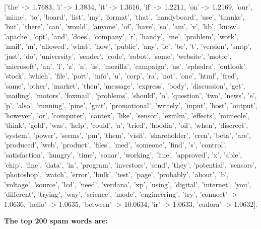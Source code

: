 \documentclass{article}
\begin{document}
['the' -> 1.7683, 'i' -> 1.3834, 'it' -> 1.3616, 'if' -> 1.2211, 'on' -> 1.2169, 'our', 'mime', 'to', 'board', 'list', 'my', 'format', 'that', 'handyboard', 'use', 'thanks', 'but', 'there', 'can', 'would', 'anyone', 'of', 'have', 'so', 'am', 'v', 'hb', 'know', 'apache', 'opt', 'and', 'does', 'company', 'r', 'handy', 'me', 'problem', 'work', 'mail', 'm', 'allowed', 'what', 'how', 'public', 'any', 'ic', 'be', 't', 'version', 'smtp', 'just', 'do', 'university', 'sender', 'code', 'robot', 'some', 'website', 'motor', 'microsoft', 'an', 'l', 'z', 'n', 'is', 'mozilla', 'campaign', 'as', 'ephedra', 'outlook', 'stock', 'which', 'file', 'port', 'info', 'u', 'corp', 'ra', 'not', 'one', 'html', 'fred', 'same', 'other', 'market', 'then', 'message', 'express', 'body', 'discussion', 'get', 'mailing', 'motors', 'foxmail', 'problems', 'should', 'o', 'question', 'two', 'news', 'e', 'p', 'also', 'running', 'pine', 'gmt', 'promotional', 'writely', 'input', 'host', 'output', 'however', 'or', 'computer', 'cantex', 'like', 'sensor', 'ezmlm', 'effects', 'mimeole', 'think', 'gold', 'was', 'help', 'could', 'a', 'tried', 'hoodia', 'oil', 'when', 'discreet', 'system', 'power', 'seems', 'pm', 'them', 'visit', 'shareholder', 'cren', 'beta', 'are', 'produced', 'web', 'product', 'files', 'med', 'someone', 'find', 's', 'control', 'satisfaction', 'hungry', 'time', 'sonar', 'working', 'line', 'approved', 'x', 'able', 'chip', 'fine', 'data', 'in', 'program', 'investors', 'send', 'they', 'potential', 'sensors', 'photoshop', 'watch', 'error', 'bulk', 'test', 'page', 'probably', 'about', 'b', 'voltage', 'source', 'lcd', 'need', 'verdana', 'xp', 'using', 'digital', 'internet', 'you', 'different', 'trying', 'way', 'science', 'mode', 'engineering', 'try', 'connect' -> 1.0636, 'hello' -> 1.0635, 'between' -> 10.0634, 'ir' -> 1.0633, 'eudora' -> 1.0632].

\textbf{The top 200 spam words are:}
\end{document}
